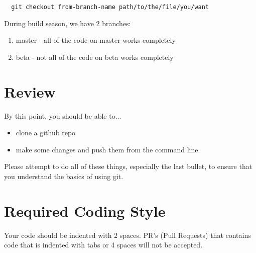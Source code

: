 \documentclass[11pt,fleqn]{article}
\begin{document}
\begin{verbatim}
  git checkout from-branch-name path/to/the/file/you/want
\end{verbatim}

During build season, we have 2 branches:
\begin{enumerate}
    \item master - all of the code on master works completely
    \item beta - not all of the code on beta works completely
\end{enumerate}

\section{Review}
By this point, you should be able to...
\begin{itemize}
\item
clone a github repo
\item
make some changes and push them from the command line
\end{itemize}

Please attempt to do all of these things, especially the last bullet, to ensure that you understand
the basics of using git.

\section{Required Coding Style}
Your code should be indented with 2 spaces. PR's (Pull Requests) that contains code that is indented with tabs or 4 spaces will not be accepted.
\end{document}
